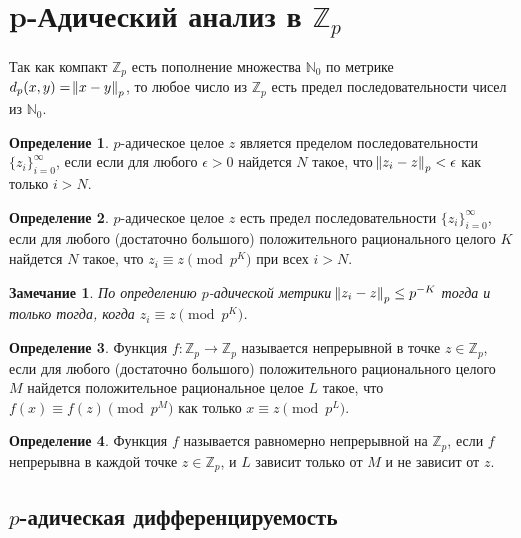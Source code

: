 \documentclass[och, master]{SCWorks}
\theoremstyle{plain}
\theoremstyle{plain}
\theoremstyle{plain}
\newtheorem{note}{Замечание}
\theoremstyle{definition}
\newtheorem{defn}{Определение}
\begin{document}
\section{p-Адический анализ в $\mathbb {Z}_p$}

Так как компакт $\mathbb {Z}_p$ есть пополнение множества $\mathbb {N}_0$ по метрике \linebreak ${d_p(x,y)=\norm{x-y}_p}$, то любое число из $\mathbb {Z}_p$ есть предел последовательности чисел из $\mathbb {N}_0$.

\begin{defn}
$p$-адическое целое $z$ является пределом последовательности $\{z_i\}^{\infty}_{i=0}$, если если для любого $\epsilon > 0$ найдется $N$ такое, что $\norm{z_i-z}_p < \epsilon$ как только $i>N$. \cite{bib:analysis:anashin}
\end{defn}

\begin{defn}
$p$-адическое целое $z$ есть предел последовательности $\{z_i\}^{\infty}_{i=0}$, если для любого (достаточно большого) положительного рационального целого $K$ найдется $N$ такое, что ${z_i \equiv z \pmod p^K}$ при всех $i>N$. \cite{bib:analysis:anashin}
\end{defn}

\begin{note}
По определению $p$-адической метрики $\norm{z_i-z}_p \le p^{-K}$ тогда и только тогда, когда $z_i \equiv z \pmod p^K$. \cite{bib:analysis:anashin}
\end{note}

\begin{defn}
Функция $f:\mathbb {Z}_p \rightarrow \mathbb {Z}_p$ называется непрерывной в точке $z \in \mathbb {Z}_p$, если для любого (достаточно большого) положительного рационального целого $M$ найдется положительное рациональное целое $L$ такое, что ${f(x) \equiv f(z) \pmod p^M}$ как только $x \equiv z \pmod{p^L}$. \cite{bib:analysis:anashin}
\end{defn}

\begin{defn}
Функция $f$ называется равномерно непрерывной на $\mathbb {Z}_p$, если $f$ непрерывна в каждой точке $z \in \mathbb {Z}_p$, и $L$ зависит только от $M$ и не зависит от $z$.\cite{bib:analysis:ciocan}
\end{defn}


\subsection{$p$-адическая дифференцируемость}
\end{document}
